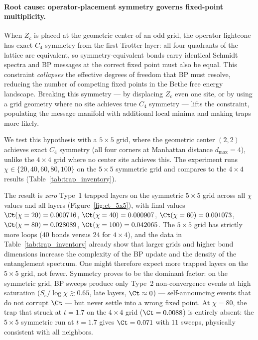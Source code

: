 \paragraph{Root cause: operator-placement symmetry governs fixed-point multiplicity.}
When $Z_c$ is placed at the geometric center of an odd grid, the operator
lightcone has exact $C_4$ symmetry from the first Trotter layer: all four
quadrants of the lattice are equivalent, so symmetry-equivalent bonds carry
identical Schmidt spectra and BP messages at the correct fixed point must also
be equal.
This constraint \emph{collapses} the effective degrees of freedom that BP must
resolve, reducing the number of competing fixed points in the Bethe free energy
landscape.
Breaking this symmetry --- by displacing $Z_c$ even one site, or by using a
grid geometry where no site achieves true $C_4$ symmetry --- lifts the
constraint, populating the message manifold with additional local minima and
making traps more likely.

We test this hypothesis with a $5\times5$ grid, where the geometric center
$(2,2)$ achieves exact $C_4$ symmetry (all four corners at Manhattan distance
$d_{\max}=4$), unlike the $4\times4$ grid where no center site achieves this.
The experiment runs $\chi \in \{20, 40, 60, 80, 100\}$ on the $5\times5$
symmetric grid and compares to the $4\times4$ results (Table~\ref{tab:trap_inventory}).

The result is \emph{zero} Type~1 trapped layers on the symmetric $5\times5$ grid
across all $\chi$ values and all layers (Figure~\ref{fig:ct_5x5}),
with final values $\Ct(\chi=20)=0.000716$, $\Ct(\chi=40)=0.000907$,
$\Ct(\chi=60)=0.001073$, $\Ct(\chi=80)=0.028089$, $\Ct(\chi=100)=0.042065$.
The $5\times5$ grid has strictly more loops ($40$ bonds versus $24$ for $4\times4$),
and the data in Table~\ref{tab:trap_inventory} already show
that larger grids and higher bond dimensions increase the complexity of the BP
update and the density of the entanglement spectrum.
One might therefore expect more trapped layers on the $5\times5$ grid, not
fewer.
Symmetry proves to be the dominant factor: on the symmetric grid, BP sweeps
produce only Type~2 non-convergence events at high saturation
($S_e/\log\chi \gtrsim 0.65$, late layers, $\Ct \approx 0$) --- self-announcing
events that do not corrupt $\Ct$ --- but never settle into a wrong fixed point.
At $\chi=80$, the trap that struck at $t=1.7$ on the $4\times4$ grid
($\Ct=0.0088$) is entirely absent: the $5\times5$ symmetric run at $t=1.7$
gives $\Ct=0.071$ with $11$ sweeps, physically consistent with all neighbors.


